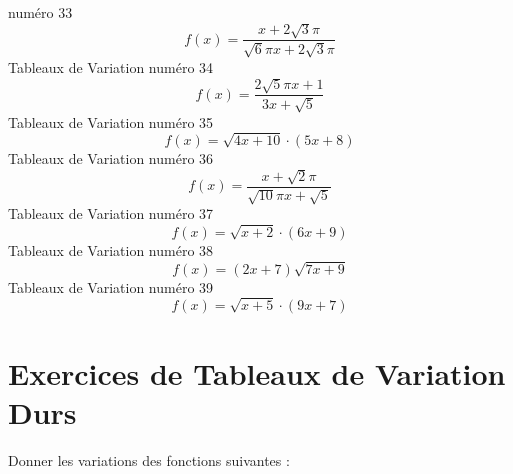 \documentclass{article}
\begin{document}
num\'ero 33 \[f(x) = \frac{x + 2 \sqrt{3} \pi}{\sqrt{6} \pi x + 2 \sqrt{3} \pi}\]Tableaux de Variation num\'ero 34 \[f(x) = \frac{2 \sqrt{5} \pi x + 1}{3 x + \sqrt{5}}\]Tableaux de Variation num\'ero 35 \[f(x) = \sqrt{4 x + 10} \cdot \left(5 x + 8\right)\]Tableaux de Variation num\'ero 36 \[f(x) = \frac{x + \sqrt{2} \pi}{\sqrt{10} \pi x + \sqrt{5}}\]Tableaux de Variation num\'ero 37 \[f(x) = \sqrt{x + 2} \cdot \left(6 x + 9\right)\]Tableaux de Variation num\'ero 38 \[f(x) = \left(2 x + 7\right) \sqrt{7 x + 9}\]Tableaux de Variation num\'ero 39 \[f(x) = \sqrt{x + 5} \cdot \left(9 x + 7\right)\]
 \section{Exercices de Tableaux de Variation Durs}

 Donner les variations des fonctions suivantes : 
\end{document}
